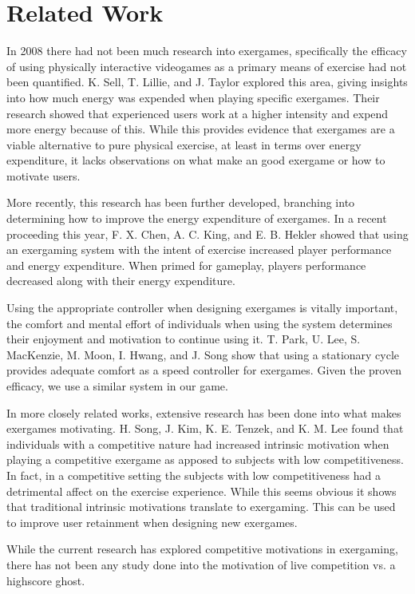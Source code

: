 \documentclass[11pt]{article}
\begin{document}
\section{Related Work}
\begin{multicols}{2}

In 2008 there had not been much research into exergames, specifically the efficacy of using physically interactive videogames as a primary means of exercise had not been quantified. K. Sell, T. Lillie, and J. Taylor \cite{sell2008energy} explored this area, giving insights into how much energy was expended when playing specific exergames. Their research showed that experienced users work at a higher intensity and expend more energy because of this. While this provides evidence that exergames are a viable alternative to pure physical exercise, at least in terms over energy expenditure, it lacks observations on what make an good exergame or how to motivate users.

More recently, this research has been further developed, branching into determining how to improve the energy expenditure of exergames. In a recent proceeding this year, F. X. Chen, A. C. King, and E. B. Hekler \cite{chen2014healthifying} showed that using an exergaming system with the intent of exercise increased player performance and energy expenditure. When primed for gameplay, players performance decreased along with their energy expenditure.

Using the appropriate controller when designing exergames is vitally important, the comfort and mental effort of individuals when using the system determines their enjoyment and motivation to continue using it. T. Park, U. Lee, S. MacKenzie, M. Moon, I. Hwang, and J. Song \cite{park2014human} show that using a stationary cycle provides adequate comfort as a speed controller for exergames. Given the proven efficacy, we use a similar system in our game.

In more closely related works, extensive research has been done into what makes exergames motivating. H. Song, J. Kim, K. E. Tenzek, and K. M. Lee \cite{song2010effects} found that individuals with a competitive nature had increased intrinsic motivation when playing a competitive exergame as apposed to subjects with low competitiveness. In fact, in a competitive setting the subjects with low competitiveness had a detrimental affect on the exercise experience. While this seems obvious it shows that traditional intrinsic motivations translate to exergaming. This can be used to improve user retainment when designing new exergames.

While the current research has explored competitive motivations in exergaming, there has not been any study done into the motivation of live competition vs. a highscore ghost.

\end{multicols}
\end{document}
